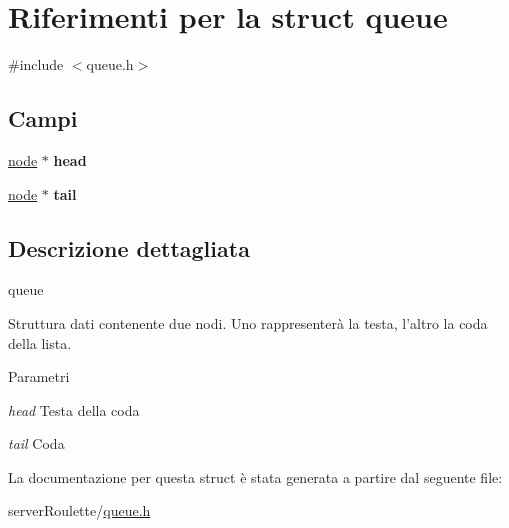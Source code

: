\hypertarget{structqueue}{
\section{Riferimenti per la struct queue}
\label{structqueue}
}


{\ttfamily \#include $<$queue.h$>$}

\subsection*{Campi}
\begin{DoxyCompactItemize}
\item 
\hypertarget{structqueue_a59dd942ec5995b18f6e2df2232ec9e16}{
\hyperlink{structnode__tag}{node} $\ast$ {\bfseries head}}
\label{structqueue_a59dd942ec5995b18f6e2df2232ec9e16}

\item 
\hypertarget{structqueue_a1fa8a11929cec8f42e26c43c6772eada}{
\hyperlink{structnode__tag}{node} $\ast$ {\bfseries tail}}
\label{structqueue_a1fa8a11929cec8f42e26c43c6772eada}

\end{DoxyCompactItemize}


\subsection{Descrizione dettagliata}
queue

Struttura dati contenente due nodi. Uno rappresenterà la testa, l'altro la coda della lista.


\begin{DoxyParams}{Parametri}
\item[{\em head}]Testa della coda \item[{\em tail}]Coda \end{DoxyParams}


La documentazione per questa struct è stata generata a partire dal seguente file:\begin{DoxyCompactItemize}
\item 
serverRoulette/\hyperlink{queue_8h}{queue.h}\end{DoxyCompactItemize}
